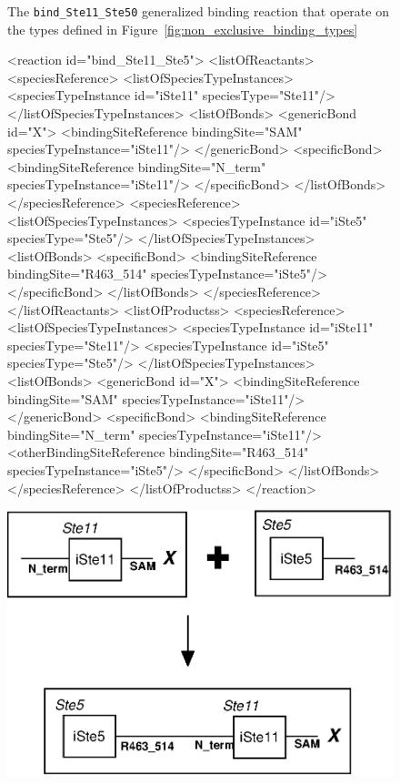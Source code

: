 \documentclass{cekarticle}
\begin{document}
\begin{figure}[h]
  \caption{The \texttt{bind\_Ste11\_Ste50} generalized binding reaction that operate on the types
  defined in Figure~\ref{fig:non_exclusive_binding_types}}
  \label{fig:bind_Ste11_Ste50}
\end{figure}

\begin{figure}[h]
\begin{example}
<reaction id="bind_Ste11_Ste5">
    <listOfReactants>
        <speciesReference>
            <listOfSpeciesTypeInstances>
                <speciesTypeInstance id="iSte11" speciesType="Ste11"/>
            </listOfSpeciesTypeInstances>
            <listOfBonds>
                <genericBond id="X">
                    <bindingSiteReference bindingSite="SAM" speciesTypeInstance="iSte11"/>
                </genericBond>
                <specificBond>
                    <bindingSiteReference bindingSite="N_term" speciesTypeInstance="iSte11"/>
                </specificBond>
            </listOfBonds>
        </speciesReference>
        <speciesReference>
            <listOfSpeciesTypeInstances>
                <speciesTypeInstance id="iSte5" speciesType="Ste5"/>
            </listOfSpeciesTypeInstances>
            <listOfBonds>
                <specificBond>
                    <bindingSiteReference bindingSite="R463_514" speciesTypeInstance="iSte5"/>
                </specificBond>
            </listOfBonds>
        </speciesReference>
    </listOfReactants>
    <listOfProductss>
        <speciesReference>
            <listOfSpeciesTypeInstances>
                <speciesTypeInstance id="iSte11" speciesType="Ste11"/>
                <speciesTypeInstance id="iSte5" speciesType="Ste5"/>
            </listOfSpeciesTypeInstances>
            <listOfBonds>
                <genericBond id="X">
                    <bindingSiteReference bindingSite="SAM" speciesTypeInstance="iSte11"/>
                </genericBond>
                <specificBond>
                    <bindingSiteReference bindingSite="N_term" speciesTypeInstance="iSte11"/>
                    <otherBindingSiteReference
                        bindingSite="R463_514" speciesTypeInstance="iSte5"/>
                </specificBond>
            </listOfBonds>
        </speciesReference>
    </listOfProductss>
</reaction>
\end{example}
  \vspace*{8pt}
  \centering
  \includegraphics[scale = 0.7]{bind_Ste11_Ste5.eps}

\end{figure}
\end{document}
